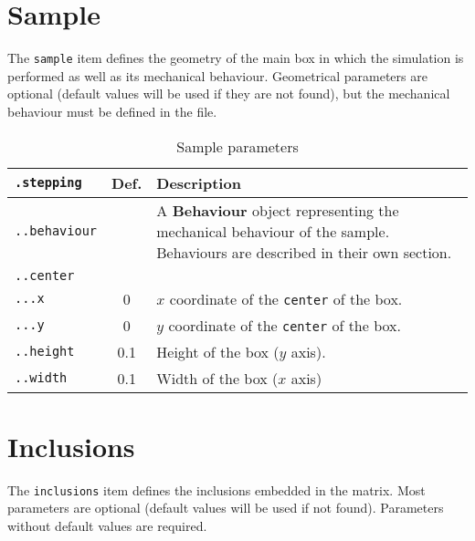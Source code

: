 \documentclass[10pt]{article}
\begin{document}
\section{Sample}

The \verb+sample+ item defines the geometry of the main box in which the simulation is performed as well as its mechanical behaviour.
Geometrical parameters are optional (default values will be used if they are not found), but the mechanical behaviour must be defined in the file.

\begin{table}[h!]
\begin{tabularx}{\textwidth}{lcX}
\verb+.stepping+ &  Def. & Description \\
\hline
\verb+..behaviour+ & & A \textbf{Behaviour} object representing the mechanical behaviour of the sample. Behaviours are described in their own section. \\
\verb+..center+ &  & \\	
\verb+...x+ & 0 & $x$ coordinate of the \verb+center+ of the box.\\
\verb+...y+ & 0 & $y$ coordinate of the \verb+center+ of the box.\\
\verb+..height+ & 0.1 & Height of the box ($y$ axis).\\
\verb+..width+ & 0.1 & Width of the box ($x$ axis)\\
\hline
\end{tabularx}
\caption{Sample parameters}
\end{table}

\section{Inclusions}

The \verb+inclusions+ item defines the inclusions embedded in the matrix.
Most parameters are optional (default values will be used if not found).
Parameters without default values are required.
\end{document}
